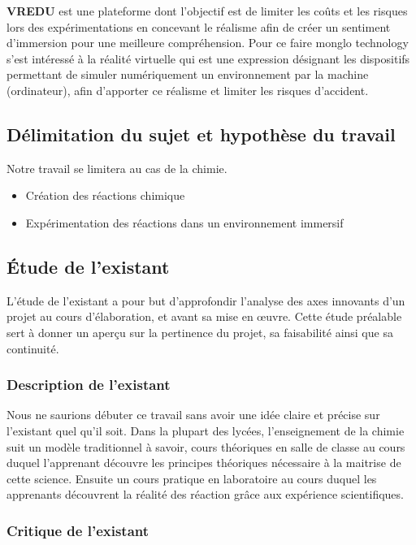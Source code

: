 \textbf{VREDU} est une plateforme dont l’objectif est de limiter les coûts et les risques lors des expérimentations en concevant le réalisme afin de créer un sentiment d’immersion pour une meilleure compréhension. Pour ce faire monglo technology s’est intéressé à la réalité virtuelle qui est une expression désignant les dispositifs permettant de simuler numériquement un environnement par la machine (ordinateur), afin d’apporter ce réalisme et limiter les risques d’accident.

\subsection{Délimitation du sujet et hypothèse du travail}

Notre travail se limitera au cas de la chimie.

\begin{itemize}
	\item Création des réactions chimique
	\item Expérimentation des réactions dans un environnement immersif
\end{itemize}

\subsection{Étude de l’existant}

L’étude de l’existant a pour but d'approfondir l'analyse des axes innovants d'un projet au cours d'élaboration, et avant sa mise en œuvre. Cette étude préalable sert à donner un aperçu sur la pertinence du projet, sa faisabilité ainsi que sa continuité.

\subsubsection{Description de l’existant}

Nous ne saurions débuter ce travail sans avoir une idée claire et précise sur l’existant quel qu’il soit. Dans la plupart des lycées, l’enseignement de la chimie suit un modèle traditionnel à savoir, cours théoriques en salle de classe au cours duquel l’apprenant découvre les principes théoriques nécessaire à la maitrise de cette science. Ensuite un cours pratique en laboratoire au cours duquel les apprenants découvrent la réalité des réaction grâce aux expérience scientifiques.


\subsubsection{Critique de l’existant}


